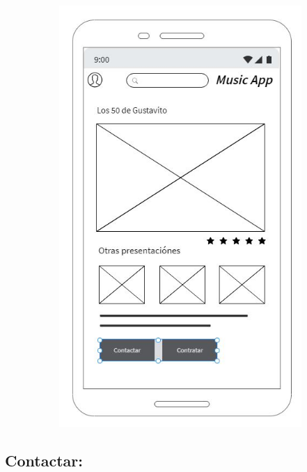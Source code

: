 \begin{figure}[hbt!]
 \centering
\includegraphics[width=12cm, height=16cm,keepaspectratio=true]{Desarrollo/Interfaces/Mockup/imgs/wire8.JPG}
\end{figure}
\newpage
\subsection{Contactar:}

